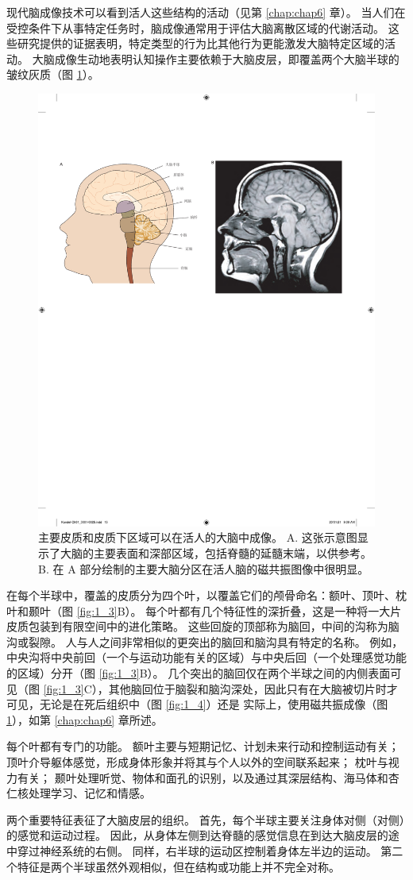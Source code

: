 现代脑成像技术可以看到活人这些结构的活动（见第 \ref{chap:chap6} 章）。 
当人们在受控条件下从事特定任务时，脑成像通常用于评估大脑离散区域的代谢活动。 
这些研究提供的证据表明，特定类型的行为比其他行为更能激发大脑特定区域的活动。 
大脑成像生动地表明认知操作主要依赖于大脑皮层，即覆盖两个大脑半球的皱纹灰质（图 \ref{fig:1_5}）。

\begin{figure}[htbp]
	\centering
	\includegraphics[width=0.5\linewidth]{chap01/fig_1_5}
	\caption{主要皮质和皮质下区域可以在活人的大脑中成像。 
		A. 这张示意图显示了大脑的主要表面和深部区域，包括脊髓的延髓末端，以供参考。 
		B. 在 A 部分绘制的主要大脑分区在活人脑的磁共振图像中很明显。}
	\label{fig:1_5}
\end{figure}


在每个半球中，覆盖的皮质分为四个叶，以覆盖它们的颅骨命名：额叶、顶叶、枕叶和颞叶（图 \ref{fig:1_3}B）。 
每个叶都有几个特征性的深折叠，这是一种将一大片皮质包装到有限空间中的进化策略。 
这些回旋的顶部称为脑回，中间的沟称为脑沟或裂隙。 
人与人之间非常相似的更突出的脑回和脑沟具有特定的名称。 
例如，中央沟将中央前回（一个与运动功能有关的区域）与中央后回（一个处理感觉功能的区域）分开（图 \ref{fig:1_3}B）。 
几个突出的脑回仅在两个半球之间的内侧表面可见（图 \ref{fig:1_3}C），其他脑回位于脑裂和脑沟深处，因此只有在大脑被切片时才可见，无论是在死后组织中（图 \ref{fig:1_4}）还是 实际上，使用磁共振成像（图 \ref{fig:1_5}），如第 \ref{chap:chap6} 章所述。


每个叶都有专门的功能。 
额叶主要与短期记忆、计划未来行动和控制运动有关； 
顶叶介导躯体感觉，形成身体形象并将其与个人以外的空间联系起来； 
枕叶与视力有关； 
颞叶处理听觉、物体和面孔的识别，以及通过其深层结构、海马体和杏仁核处理学习、记忆和情感。


两个重要特征表征了大脑皮层的组织。 
首先，每个半球主要关注身体对侧（对侧）的感觉和运动过程。 
因此，从身体左侧到达脊髓的感觉信息在到达大脑皮层的途中穿过神经系统的右侧。 
同样，右半球的运动区控制着身体左半边的运动。 
第二个特征是两个半球虽然外观相似，但在结构或功能上并不完全对称。


